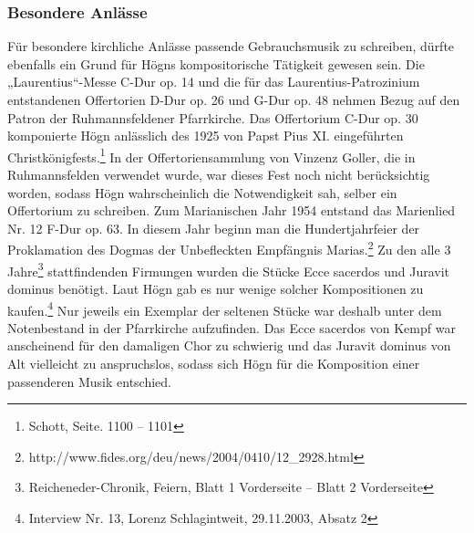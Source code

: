 \documentclass[a4paper]{article}
\begin{document}
\subsubsection{Besondere Anlässe}
\hypertarget{RefHeadingToc100333747}{}Für besondere kirchliche Anlässe
passende Gebrauchsmusik zu schreiben, dürfte ebenfalls ein Grund für
Högns kompositorische Tätigkeit gewesen sein. Die „Laurentius“-Messe
C-Dur op. 14 und die für das Laurentius-Patrozinium entstandenen
Offertorien D-Dur op. 26 und G-Dur op. 48 nehmen Bezug auf den Patron
der Ruhmannsfeldener Pfarrkirche. Das Offertorium C-Dur op. 30
komponierte Högn anlässlich des 1925 von Papst Pius XI. eingeführten
Christkönigfests.\footnote{ Schott, Seite. 1100 – 1101} In der
Offertoriensammlung von Vinzenz Goller, die in Ruhmannsfelden verwendet
wurde, war dieses Fest noch nicht berücksichtig worden, sodass Högn
wahrscheinlich die Notwendigkeit sah, selber ein Offertorium zu
schreiben. Zum Marianischen Jahr 1954 entstand das Marienlied Nr. 12
F-Dur op. 63. In diesem Jahr beginn man die Hundertjahrfeier der
Proklamation des Dogmas der Unbefleckten Empfängnis Marias.\footnote{
http://www.fides.org/deu/news/2004/0410/12\_2928.html} Zu den alle 3
Jahre\footnote{ Reicheneder-Chronik, Feiern, Blatt 1 Vorderseite –
Blatt 2 Vorderseite} stattfindenden Firmungen wurden die Stücke Ecce
sacerdos und Juravit dominus benötigt. Laut Högn gab es nur wenige
solcher Kompositionen zu kaufen.\footnote{ Interview Nr. 13, Lorenz
Schlagintweit, 29.11.2003, Absatz 2} Nur jeweils ein Exemplar der
seltenen Stücke war deshalb unter dem Notenbestand in der Pfarrkirche
aufzufinden. Das Ecce sacerdos von Kempf war anscheinend für den
damaligen Chor zu schwierig und das Juravit dominus von Alt vielleicht
zu anspruchslos, sodass sich Högn für die Komposition einer passenderen
Musik entschied.
\end{document}
